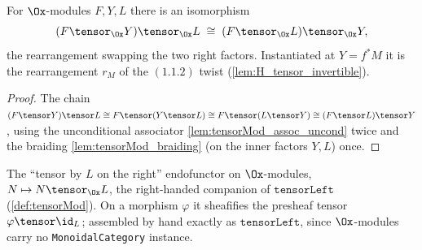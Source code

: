 \begin{lemma}

  \label{lem:tensorRearrange}
  For $\Ox$-modules $F, Y, L$ there is an isomorphism
  \[
    (F \tensor_{\Ox} Y) \tensor_{\Ox} L \;\cong\; (F \tensor_{\Ox} L) \tensor_{\Ox} Y,
  \]
  the rearrangement swapping the two right factors. Instantiated at $Y = f^*M$ it is
  the rearrangement $r_M$ of the $(1.1.2)$ twist (\cref{lem:H_tensor_invertible}).
  \begin{proof}
    The chain $(F \tensor Y) \tensor L \cong F \tensor (Y \tensor L)
    \cong F \tensor (L \tensor Y) \cong (F \tensor L) \tensor Y$, using the
    unconditional associator \cref{lem:tensorMod_assoc_uncond} twice and the braiding
    \cref{lem:tensorMod_braiding} (on the inner factors $Y, L$) once.
  \end{proof}
\end{lemma}

\begin{definition}

  \label{def:tensorRight}
  The ``tensor by $L$ on the right'' endofunctor on $\Ox$-modules, $N \mapsto N \tensor_{\Ox} L$,
  the right-handed companion of $\texttt{tensorLeft}$ (\cref{def:tensorMod}). On a morphism
  $\varphi$ it sheafifies the presheaf tensor $\varphi \tensor \id_L$; assembled by hand
  exactly as $\texttt{tensorLeft}$, since $\Ox$-modules carry no
  \texttt{MonoidalCategory} instance.
\end{definition}

